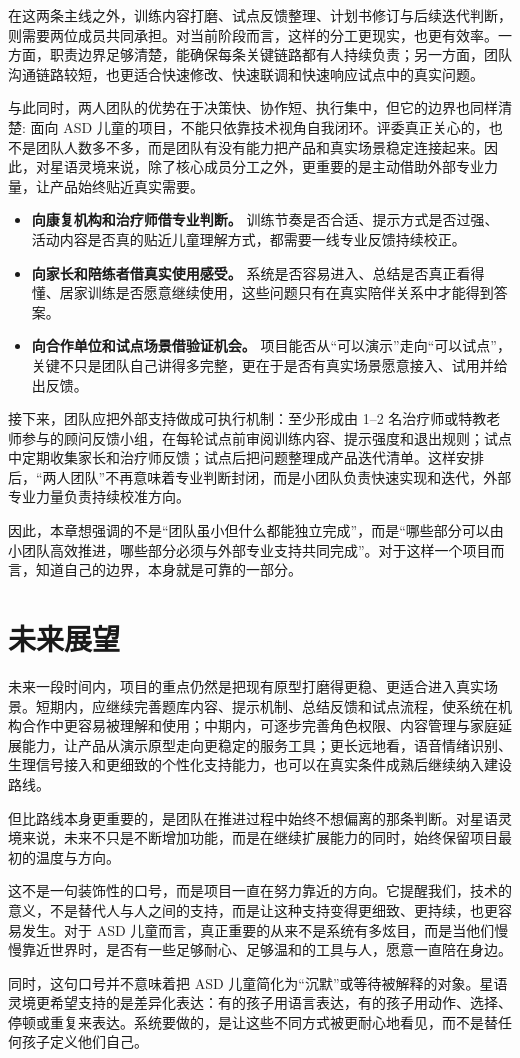 在这两条主线之外，训练内容打磨、试点反馈整理、计划书修订与后续迭代判断，则需要两位成员共同承担。对当前阶段而言，这样的分工更现实，也更有效率。一方面，职责边界足够清楚，能确保每条关键链路都有人持续负责；另一方面，团队沟通链路较短，也更适合快速修改、快速联调和快速响应试点中的真实问题。

与此同时，两人团队的优势在于决策快、协作短、执行集中，但它的边界也同样清楚: 面向 ASD 儿童的项目，不能只依靠技术视角自我闭环。评委真正关心的，也不是团队人数多不多，而是团队有没有能力把产品和真实场景稳定连接起来。因此，对星语灵境来说，除了核心成员分工之外，更重要的是主动借助外部专业力量，让产品始终贴近真实需要。

\begin{itemize}
  \item \textbf{向康复机构和治疗师借专业判断。} 训练节奏是否合适、提示方式是否过强、活动内容是否真的贴近儿童理解方式，都需要一线专业反馈持续校正。
  \item \textbf{向家长和陪练者借真实使用感受。} 系统是否容易进入、总结是否真正看得懂、居家训练是否愿意继续使用，这些问题只有在真实陪伴关系中才能得到答案。
  \item \textbf{向合作单位和试点场景借验证机会。} 项目能否从“可以演示”走向“可以试点”，关键不只是团队自己讲得多完整，更在于是否有真实场景愿意接入、试用并给出反馈。
\end{itemize}

接下来，团队应把外部支持做成可执行机制：至少形成由 1--2 名治疗师或特教老师参与的顾问反馈小组，在每轮试点前审阅训练内容、提示强度和退出规则；试点中定期收集家长和治疗师反馈；试点后把问题整理成产品迭代清单。这样安排后，“两人团队”不再意味着专业判断封闭，而是小团队负责快速实现和迭代，外部专业力量负责持续校准方向。

因此，本章想强调的不是“团队虽小但什么都能独立完成”，而是“哪些部分可以由小团队高效推进，哪些部分必须与外部专业支持共同完成”。对于这样一个项目而言，知道自己的边界，本身就是可靠的一部分。

\section{未来展望}
未来一段时间内，项目的重点仍然是把现有原型打磨得更稳、更适合进入真实场景。短期内，应继续完善题库内容、提示机制、总结反馈和试点流程，使系统在机构合作中更容易被理解和使用；中期内，可逐步完善角色权限、内容管理与家庭延展能力，让产品从演示原型走向更稳定的服务工具；更长远地看，语音情绪识别、生理信号接入和更细致的个性化支持能力，也可以在真实条件成熟后继续纳入建设路线。

但比路线本身更重要的，是团队在推进过程中始终不想偏离的那条判断。对星语灵境来说，未来不只是不断增加功能，而是在继续扩展能力的同时，始终保留项目最初的温度与方向。


这不是一句装饰性的口号，而是项目一直在努力靠近的方向。它提醒我们，技术的意义，不是替代人与人之间的支持，而是让这种支持变得更细致、更持续，也更容易发生。对于 ASD 儿童而言，真正重要的从来不是系统有多炫目，而是当他们慢慢靠近世界时，是否有一些足够耐心、足够温和的工具与人，愿意一直陪在身边。

同时，这句口号并不意味着把 ASD 儿童简化为“沉默”或等待被解释的对象。星语灵境更希望支持的是差异化表达：有的孩子用语言表达，有的孩子用动作、选择、停顿或重复来表达。系统要做的，是让这些不同方式被更耐心地看见，而不是替任何孩子定义他们自己。
